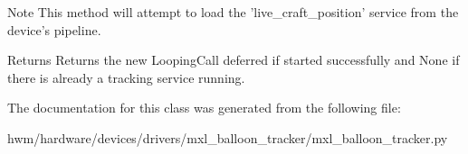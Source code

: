 \begin{DoxyNote}{Note}
This method will attempt to load the 'live\-\_\-craft\-\_\-position' service from the device's pipeline.
\end{DoxyNote}
\begin{DoxyReturn}{Returns}
Returns the new Looping\-Call deferred if started successfully and None if there is already a tracking service running. 
\end{DoxyReturn}


The documentation for this class was generated from the following file\-:\begin{DoxyCompactItemize}
\item 
hwm/hardware/devices/drivers/mxl\-\_\-balloon\-\_\-tracker/mxl\-\_\-balloon\-\_\-tracker.\-py\end{DoxyCompactItemize}
